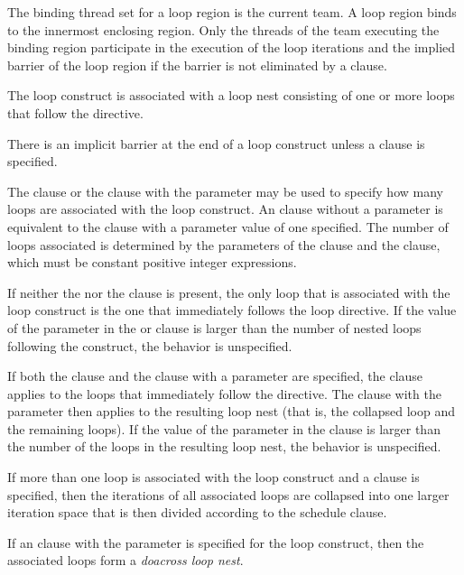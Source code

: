\binding
The binding thread set for a loop region is the current team. A loop region binds to the 
innermost enclosing  region. Only the threads of the team executing the 
binding  region participate in the execution of the loop iterations and the 
implied barrier of the loop region if the barrier is not eliminated by a  clause.

\descr
The loop construct is associated with a loop nest consisting of one or more loops that 
follow the directive.

There is an implicit barrier at the end of a loop construct unless a  clause is 
specified.

The  clause or the  clause with the parameter may be used to specify how many loops are associated with the loop construct. An  clause without a parameter is equivalent to the  clause with a parameter value of one specified. The number of loops associated is determined by the parameters of the  clause and the  clause, which must be constant positive integer expressions.

If neither the  nor the  clause is present, the only loop that is associated with the loop construct is the one that immediately follows the loop directive. If the value of the parameter in the  or  clause is larger than the number of nested loops following the construct, the behavior is unspecified.

If both the  clause and the  clause with a parameter are specified, the  clause applies to the loops that immediately follow the directive. The  clause with the parameter then applies to the resulting loop nest (that is, the collapsed loop and the remaining loops). If the value of the parameter in the  clause is larger than the number of the loops in the resulting loop nest, the behavior is unspecified.

If more than one loop is associated with the loop construct and a  clause is specified, then the iterations of all associated loops are collapsed into one larger iteration space that is then divided according to the schedule clause.

If an  clause with the parameter is specified for the loop construct, then the associated loops form a \emph{doacross loop nest}. 

